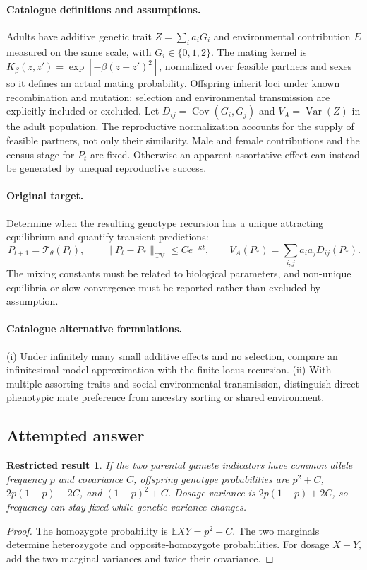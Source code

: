\documentclass[11pt]{article}
\newcommand{\E}{\mathbb E}
\DeclareMathOperator{\Var}{Var}
\DeclareMathOperator{\Cov}{Cov}
\providecommand{\E}{\mathbb E}
\providecommand{\Var}{\operatorname{Var}}
\providecommand{\Cov}{\operatorname{Cov}}
\newtheorem{attemptresult}{Restricted result}[section]
\begin{document}
\paragraph{Catalogue definitions and assumptions.}
Adults have additive genetic trait $Z=\sum_i a_iG_i$ and environmental contribution $E$ measured on the same scale, with $G_i\in\{0,1,2\}$. The mating kernel is $K_\beta(z,z')=\exp[-\beta(z-z')^2]$, normalized over feasible partners and sexes so it defines an actual mating probability. Offspring inherit loci under known recombination and mutation; selection and environmental transmission are explicitly included or excluded. Let $D_{ij}=\Cov(G_i,G_j)$ and $V_A=\Var(Z)$ in the adult population. The reproductive normalization accounts for the supply of feasible partners, not only their similarity. Male and female contributions and the census stage for $P_t$ are fixed. Otherwise an apparent assortative effect can instead be generated by unequal reproductive success.
\paragraph{Original target.}
Determine when the resulting genotype recursion has a unique attracting equilibrium and quantify transient predictions:
\[
 P_{t+1}=\mathcal T_\theta(P_t),\qquad
 \|P_t-P_*\|_{\mathrm{TV}}\le C e^{-\kappa t},\qquad
 V_A(P_*)=\sum_{i,j}a_i a_jD_{ij}(P_*).
\]
The mixing constants must be related to biological parameters, and non-unique equilibria or slow convergence must be reported rather than excluded by assumption.
\paragraph{Catalogue alternative formulations.}
(i) Under infinitely many small additive effects and no selection, compare an infinitesimal-model approximation with the finite-locus recursion. (ii) With multiple assorting traits and social environmental transmission, distinguish direct phenotypic mate preference from ancestry sorting or shared environment.
\subsection{Attempted answer}
\begin{attemptresult}
If the two parental gamete indicators have common allele frequency $p$ and covariance $C$, offspring genotype probabilities are $p^2+C$, $2p(1-p)-2C$, and $(1-p)^2+C$. Dosage variance is $2p(1-p)+2C$, so frequency can stay fixed while genetic variance changes.
\end{attemptresult}
\begin{proof}
The homozygote probability is $\E XY=p^2+C$. The two marginals determine heterozygote and opposite-homozygote probabilities. For dosage $X+Y$, add the two marginal variances and twice their covariance.
\end{proof}
\end{document}

